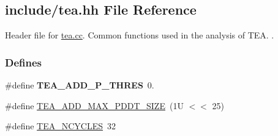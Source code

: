 \hypertarget{tea_8hh}{\subsection{include/tea.hh \-File \-Reference}
\label{tea_8hh}
}


\-Header file for \hyperlink{tea_8cc}{tea.\-cc}. \-Common functions used in the analysis of \-T\-E\-A. .  


\subsubsection*{\-Defines}
\begin{DoxyCompactItemize}
\item 
\hypertarget{tea_8hh_a8549159866b28395fa97a633b06604df}{\#define {\bfseries \-T\-E\-A\-\_\-\-A\-D\-D\-\_\-\-P\-\_\-\-T\-H\-R\-E\-S}~0.}\label{tea_8hh_a8549159866b28395fa97a633b06604df}

\item 
\#define \hyperlink{tea_8hh_a519acd40ae204e05f82d8ad7116a2843}{\-T\-E\-A\-\_\-\-A\-D\-D\-\_\-\-M\-A\-X\-\_\-\-P\-D\-D\-T\-\_\-\-S\-I\-Z\-E}~(1\-U $<$$<$ 25)
\item 
\#define \hyperlink{tea_8hh_a731ff0e924a27e36c0f7bc72a7d383c5}{\-T\-E\-A\-\_\-\-N\-C\-Y\-C\-L\-E\-S}~32
\end{DoxyCompactItemize}
